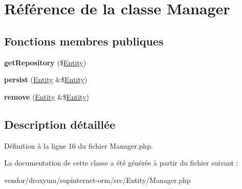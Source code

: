 \hypertarget{class_o_r_m_1_1_entity_1_1_manager}{}\section{Référence de la classe Manager}
\label{class_o_r_m_1_1_entity_1_1_manager}
\subsection*{Fonctions membres publiques}
\begin{DoxyCompactItemize}
\item 
{\bfseries get\+Repository} (\$\hyperlink{class_o_r_m_1_1_entity_1_1_entity}{Entity})\hypertarget{class_o_r_m_1_1_entity_1_1_manager_a8b9985964c539be5d33614ef78920b98}{}\label{class_o_r_m_1_1_entity_1_1_manager_a8b9985964c539be5d33614ef78920b98}

\item 
{\bfseries persist} (\hyperlink{class_o_r_m_1_1_entity_1_1_entity}{Entity} \&\$\hyperlink{class_o_r_m_1_1_entity_1_1_entity}{Entity})\hypertarget{class_o_r_m_1_1_entity_1_1_manager_a2d4d6a0e20d965842d556919d667dc73}{}\label{class_o_r_m_1_1_entity_1_1_manager_a2d4d6a0e20d965842d556919d667dc73}

\item 
{\bfseries remove} (\hyperlink{class_o_r_m_1_1_entity_1_1_entity}{Entity} \&\$\hyperlink{class_o_r_m_1_1_entity_1_1_entity}{Entity})\hypertarget{class_o_r_m_1_1_entity_1_1_manager_a524bb2ae0ba398613293bb49092a3824}{}\label{class_o_r_m_1_1_entity_1_1_manager_a524bb2ae0ba398613293bb49092a3824}

\end{DoxyCompactItemize}


\subsection{Description détaillée}


Définition à la ligne 16 du fichier Manager.\+php.



La documentation de cette classe a été générée à partir du fichier suivant \+:\begin{DoxyCompactItemize}
\item 
vendor/droxyum/supinternet-\/orm/src/\+Entity/Manager.\+php\end{DoxyCompactItemize}
